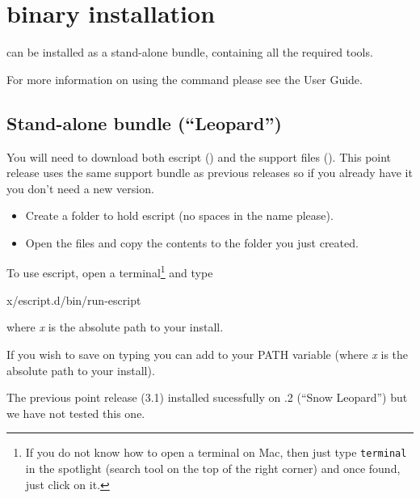 %
%
%

\section{\macosx binary installation}
\label{sec:binmac}

\esfinley can be installed as a stand-alone bundle, containing all the required tools.

For more information on using the  command please see the User Guide.

\subsection{Stand-alone bundle  (``Leopard'')}

You will need to download both escript () and the support files ().
This point release uses the same support bundle as previous releases so if you already have it you don't need a new version.
\begin{itemize}
\item Create a folder to hold escript (no spaces in the name please).
\item Open the  files and copy the contents to the folder you just created.
\end{itemize}

To use escript, open a terminal\footnote{If you do not know how to open a terminal on Mac, then just type \texttt{terminal} in the spotlight (search tool on the top of the right corner) and once found, just click on it.} and type
\begin{shellCode}
x/escript.d/bin/run-escript
\end{shellCode}
where \textit{x} is the absolute path to your install.

If you wish to save on typing you can add  to your PATH variable (where \textit{x} is the absolute path to your install). 


The previous point release (3.1) installed sucessfully on .2 (``Snow Leopard'') but we have not tested this one. 

